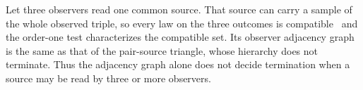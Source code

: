 \begin{remark}\label{rem:hypergraph}
Let three observers read one common source. That source can carry a sample of the whole observed triple, so every law on the three outcomes is compatible~\cite[Proposition 3.7]{Fritz2012} and the order-one test characterizes the compatible set. Its observer adjacency graph is the same as that of the pair-source triangle, whose hierarchy does not terminate. Thus the adjacency graph alone does not decide termination when a source may be read by three or more observers.
\end{remark}




